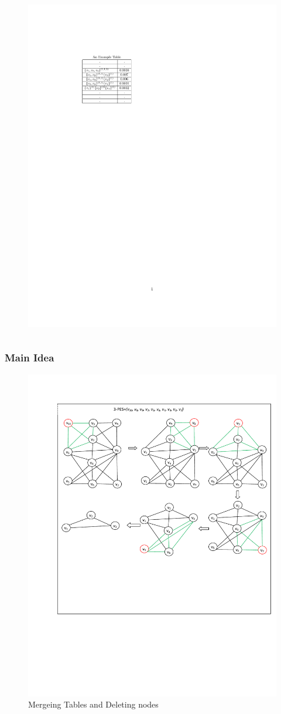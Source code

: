 \documentclass{beamer}
\begin{document}
\begin{frame}
\begin{columns}
\begin{figure}
\includegraphics[scale=0.9]{Tab.pdf}
\end{figure}
\end{columns}
\end{frame}
\begin{frame}
\frametitle{Main Idea}
\begin{figure}
\includegraphics[height=2.4 in, width=4.5 in ]{Network1.pdf}
\caption{Mergeing Tables and Deleting nodes}
\end{figure}
\end{frame}
\end{document}
